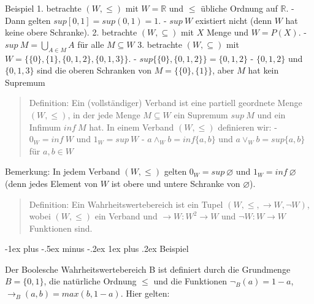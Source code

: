 \documentclass[a4paper]{article}
\makeatletter
\renewcommand{\subsubsection}{\@startsection{subsubsection}{3}{0mm}%
                {-1ex plus -.5ex minus -.2ex}%
                {1ex plus .2ex}%
                {\normalfont\small\bfseries}}
\makeatother
\begin{document}
\begin{multicols}{3}
  Beispiel 1. betrachte $(W,\leq)$ mit $W=\mathbb{R}$ und $\leq$ übliche
  Ordnung auf $\mathbb{R}$. - Dann gelten $sup[0,1] = sup(0,1) =1$. -
  $sup\ W$ existiert nicht (denn $W$ hat keine obere Schranke). 2.
  betrachte $(W,\subseteq)$ mit $X$ Menge und $W =P(X)$. -
  $sup\ M=\bigcup_{A\in M} A$ für alle $M\subseteq W$ 3. betrachte
  $(W,\subseteq)$ mit $W=\{\{0\},\{1\},\{0,1,2\},\{0,1,3\}\}$. -
  $sup\{\{0\},\{0,1,2\}\}=\{0,1,2\}$ - $\{0,1,2\}$ und $\{0,1,3\}$ sind
  die oberen Schranken von $M=\{\{0\},\{1\}\}$, aber $M$ hat kein Supremum

  \begin{quote}
    Definition: Ein (vollständiger) Verband ist eine partiell geordnete
    Menge $(W,\leq)$, in der jede Menge $M\subseteq W$ ein Supremum $sup\ M$
    und ein Infimum $inf\ M$ hat. In einem Verband $(W,\leq)$ definieren
    wir: - $0_W = inf\ W$ und $1_W= sup\ W$ - $a\wedge_W b= inf\{a,b\}$ und
    $a\vee_W b= sup\{a,b\}$ für $a,b\in W$
  \end{quote}

  Bemerkung: In jedem Verband $(W,\leq)$ gelten $0_W= sup\ \varnothing$
  und $1_W= inf\ \varnothing$ (denn jedes Element von $W$ ist obere und
  untere Schranke von $\varnothing$).

  \begin{quote}
    Definition: Ein Wahrheitswertebereich ist ein Tupel
    $(W,\leq,\rightarrow W,\lnot W)$, wobei $(W,\leq)$ ein Verband und
    $\rightarrow W:W^2 \rightarrow W$ und $\lnot W:W\rightarrow W$
    Funktionen sind.
  \end{quote}

  \subsubsection{Beispiel}\label{beispiel-2}

  \begin{itemize*}
    \itemsep1pt\parskip0pt
    \item
          Der Boolesche Wahrheitswertebereich B ist definiert durch die
          Grundmenge $B=\{0,1\}$, die natürliche Ordnung $\leq$ und die
          Funktionen $\lnot_B (a) = 1-a$, $\rightarrow_B(a,b) = max(b, 1 -a)$.
          Hier gelten:


\end{itemize*}
\end{multicols}
\end{document}
